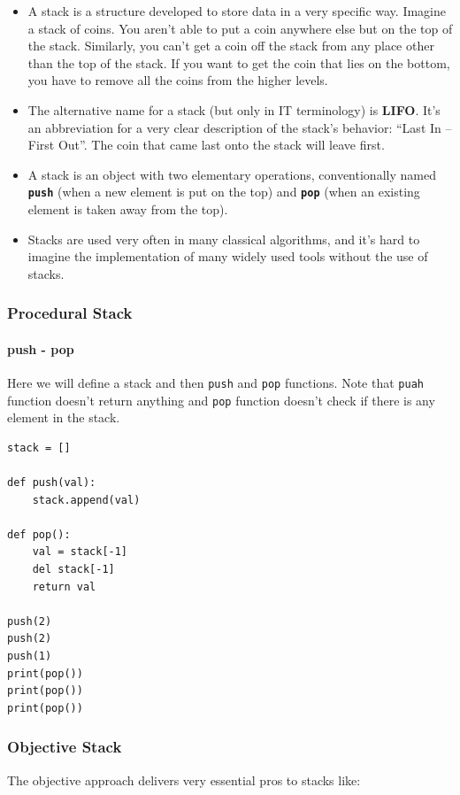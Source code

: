 \documentclass[11pt]{article}
\begin{document}
\begin{itemize}
\item A stack is a structure developed to store data in a very specific
way. Imagine a stack of coins. You aren’t able to put a coin
anywhere else but on the top of the stack. Similarly, you can’t get
a coin off the stack from any place other than the top of the
stack. If you want to get the coin that lies on the bottom, you have
to remove all the coins from the higher levels.
\item The alternative name for a stack (but only in IT terminology) is
\textbf{LIFO}. It’s an abbreviation for a very clear description of the
stack’s behavior: “Last In – First Out”. The coin that came last
onto the stack will leave first.
\item A stack is an object with two elementary operations, conventionally
named \textbf{\texttt{push}} (when a new element is put on the top) and \textbf{\texttt{pop}} (when an
existing element is taken away from the top).
\item Stacks are used very often in many classical algorithms, and it’s
hard to imagine the implementation of many widely used tools without
the use of stacks.
\end{itemize}

\subsubsection{Procedural Stack}
\label{sec:org17e9c83}
\paragraph{push - pop}
\label{sec:orgc0b2a04}
Here we will define a stack and then \texttt{push} and \texttt{pop} functions. Note
that \texttt{puah} function doesn’t return anything and \texttt{pop} function
doesn’t check if there is any element in the stack.

\begin{verbatim}
stack = []

def push(val):
    stack.append(val)

def pop():
    val = stack[-1]
    del stack[-1]
    return val

push(2)
push(2)
push(1)
print(pop())
print(pop())
print(pop())
\end{verbatim}

\subsubsection{Objective Stack}
\label{sec:org9453f20}
The objective approach delivers very essential pros to stacks like:
\end{document}
